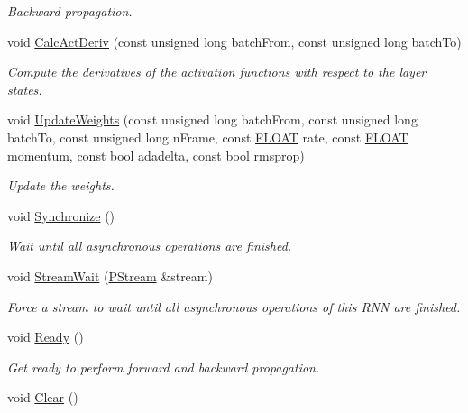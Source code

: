 \begin{DoxyCompactItemize}
\begin{DoxyCompactList}\small\item\em Backward propagation. \end{DoxyCompactList}\item 
void \hyperlink{classfractal_1_1Rnn_a36ebbae7902ee09a1ee64eea1219e939}{Calc\+Act\+Deriv} (const unsigned long batch\+From, const unsigned long batch\+To)
\begin{DoxyCompactList}\small\item\em Compute the derivatives of the activation functions with respect to the layer states. \end{DoxyCompactList}\item 
void \hyperlink{classfractal_1_1Rnn_ac1431fc224150e1e7753b1a3ad2c7fac}{Update\+Weights} (const unsigned long batch\+From, const unsigned long batch\+To, const unsigned long n\+Frame, const \hyperlink{namespacefractal_a1c2d2530689575d5ccb56bae52af70d3}{F\+L\+O\+A\+T} rate, const \hyperlink{namespacefractal_a1c2d2530689575d5ccb56bae52af70d3}{F\+L\+O\+A\+T} momentum, const bool adadelta, const bool rmsprop)
\begin{DoxyCompactList}\small\item\em Update the weights. \end{DoxyCompactList}\item 
void \hyperlink{classfractal_1_1Rnn_a61f2e8a15b24e37207f473418c30324e}{Synchronize} ()
\begin{DoxyCompactList}\small\item\em Wait until all asynchronous operations are finished. \end{DoxyCompactList}\item 
void \hyperlink{classfractal_1_1Rnn_ab309d7133835bb7c64415679c977c92d}{Stream\+Wait} (\hyperlink{classfractal_1_1PStream}{P\+Stream} \&stream)
\begin{DoxyCompactList}\small\item\em Force a {\itshape stream} to wait until all asynchronous operations of this R\+N\+N are finished. \end{DoxyCompactList}\item 
void \hyperlink{classfractal_1_1Rnn_a907f94c280782ef96ee7041d5711db61}{Ready} ()
\begin{DoxyCompactList}\small\item\em Get ready to perform forward and backward propagation. \end{DoxyCompactList}\item 
void \hyperlink{classfractal_1_1Rnn_adfde0d83db888e47db7ed9e71369fab1}{Clear} ()

\end{DoxyCompactItemize}
